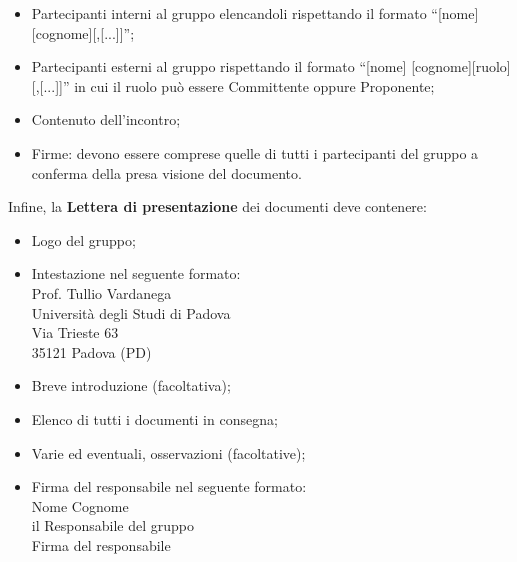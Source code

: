 {{\begin{itemize}
			\item Partecipanti interni al gruppo elencandoli rispettando il formato “[nome] [cognome][,[...]]”;
			\item Partecipanti esterni al gruppo rispettando il formato “[nome] [cognome][ruolo][,[...]]” in cui il ruolo può essere Committente oppure Proponente;
			\item Contenuto dell'incontro;
			\item Firme: devono essere comprese quelle di tutti i partecipanti del gruppo \gruppo a conferma della presa visione del documento.
		\end{itemize}
		Infine, la \textbf{Lettera di presentazione} dei documenti deve contenere:
		\begin{itemize}
			\item Logo del gruppo;
			\item Intestazione nel seguente formato:\\
					Prof. Tullio Vardanega\\
					Università degli Studi di Padova\\
					Via Trieste 63\\
					35121 Padova (PD)
			\item Breve introduzione (facoltativa);
			\item Elenco di tutti i documenti in consegna;
			\item Varie ed eventuali, osservazioni (facoltative);
			\item Firma del responsabile nel seguente formato:\\
					{Nome} {Cognome}\\
					il Responsabile del gruppo \gruppo \\
					{Firma del responsabile}
		\end{itemize}		
	}
}
